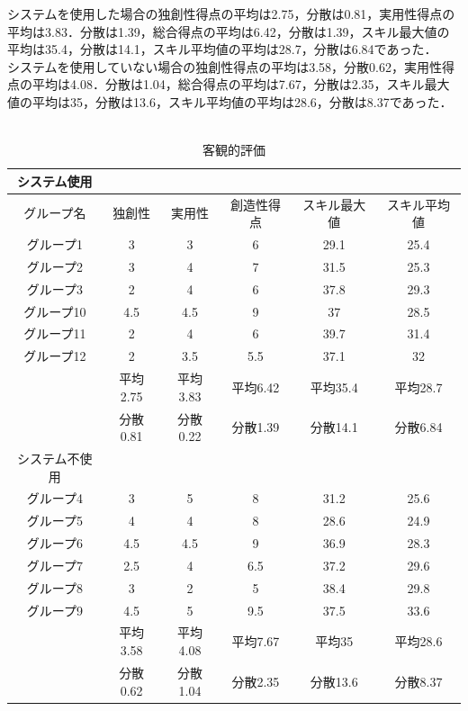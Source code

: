 \documentclass{funthesis}
\begin{document}
システムを使用した場合の独創性得点の平均は2.75，分散は0.81，実用性得点の平均は3.83．分散は1.39，総合得点の平均は6.42，分散は1.39，スキル最大値の平均は35.4，分散は14.1，スキル平均値の平均は28.7，分散は6.84であった．\\
システムを使用していない場合の独創性得点の平均は3.58，分散0.62，実用性得点の平均は4.08．分散は1.04，総合得点の平均は7.67，分散は2.35，スキル最大値の平均は35，分散は13.6，スキル平均値の平均は28.6，分散は8.37であった．\\

\ 
\begin{table}[H]
\begin{center}

  \caption{客観的評価}
  \begin{tabular}{cccccc} \hline
  システム使用\tabularnewline \hline
  グループ名&独創性&実用性&創造性得点
  &スキル最大値 & スキル平均値\tabularnewline \hline
    グループ1&3&3&6&29.1 &25.4\tabularnewline
    グループ2&3&4&7& 31.5&25.3 \tabularnewline
    グループ3&2&4&6 &37.8&29.3\tabularnewline
    グループ10&4.5&4.5&9&37&28.5 \tabularnewline
    グループ11&2&4&6&39.7&31.4 \tabularnewline
    グループ12&2&3.5&5.5&37.1&32 \tabularnewline \hline 
     &平均2.75&平均3.83&平均6.42&平均35.4&平均28.7\tabularnewline
    &分散0.81&分散0.22&分散1.39&分散14.1&分散6.84\tabularnewline 
      \hline \hline 
   システム不使用\tabularnewline \hline 
    グループ4&3&5&8&31.2&25.6 \tabularnewline
    グループ5&4&4&8&28.6&24.9 \tabularnewline
    グループ6&4.5&4.5&9 &36.9&28.3\tabularnewline
    グループ7&2.5&4&6.5&37.2&29.6 \tabularnewline
    グループ8&3&2&5 &38.4&29.8\tabularnewline
    グループ9&4.5&5&9.5&37.5&33.6 \tabularnewline
         \hline
         &平均3.58&平均4.08&平均7.67&平均35&平均28.6\tabularnewline 
    &分散0.62&分散1.04&分散2.35&分散13.6&分散8.37\tabularnewline \hline
  \end{tabular}
  \label{客観的評価}
  \end{center}
\end{table}
\end{document}
